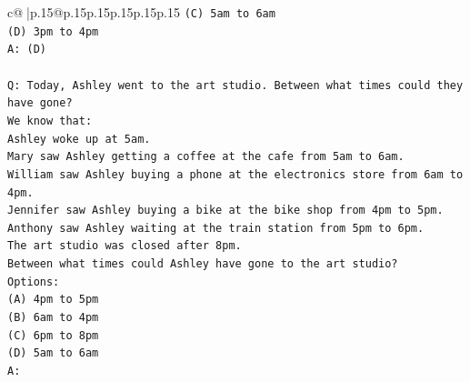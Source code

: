 \documentclass{article}
\begin{document}
{\begin{supertabular}{c@{$\;$}|p{.15\linewidth}@{}p{.15\linewidth}p{.15\linewidth}p{.15\linewidth}p{.15\linewidth}p{.15\linewidth}}
{{{\texttt{(C) 5am to 6am} \\
\texttt{(D) 3pm to 4pm} \\
\texttt{A: (D)} \\
\\ 
\texttt{Q: Today, Ashley went to the art studio. Between what times could they have gone?} \\
\texttt{We know that:} \\
\texttt{Ashley woke up at 5am.} \\
\texttt{Mary saw Ashley getting a coffee at the cafe from 5am to 6am.} \\
\texttt{William saw Ashley buying a phone at the electronics store from 6am to 4pm.} \\
\texttt{Jennifer saw Ashley buying a bike at the bike shop from 4pm to 5pm.} \\
\texttt{Anthony saw Ashley waiting at the train station from 5pm to 6pm.} \\
\texttt{The art studio was closed after 8pm.} \\
\texttt{Between what times could Ashley have gone to the art studio?} \\
\texttt{Options:} \\
\texttt{(A) 4pm to 5pm} \\
\texttt{(B) 6am to 4pm} \\
\texttt{(C) 6pm to 8pm} \\
\texttt{(D) 5am to 6am} \\
\texttt{A:} \\
            }
        }
    }
     \\ \\


\end{supertabular}}
\end{document}
